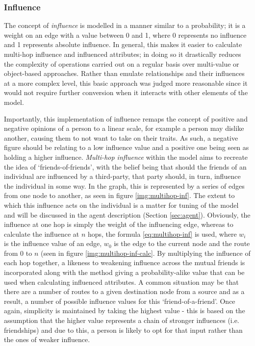 \documentclass[]{report}
\begin{document}
\subsubsection{Influence}
The concept of \emph{influence} is modelled in a manner similar to a probability; it is a weight on an edge with a value between 0 and 1, where 0 represents no influence and 1 represents absolute influence. In general, this makes it easier to calculate multi-hop influence and influenced attributes; in doing so it drastically reduces the complexity of operations carried out on a regular basis over multi-value or object-based approaches. Rather than emulate relationships and their influences at a more complex level, this basic approach was judged more reasonable since it would not require further conversion when it interacts with other elements of the model. 

Importantly, this implementation of influence remaps the concept of positive and negative opinions of a person to a linear scale, for example a person may dislike another, causing them to not want to take on their traits. As such, a negative figure should be relating to a low influence value and a positive one being seen as holding a higher influence.
\emph{Multi-hop influence} within the model aims to recreate the idea of `friends-of-friends', with the belief being that should the friends of an individual are influenced by a third-party, that party should, in turn, influence the individual in some way. In the graph, this is represented by a series of edges from one node to another, as seen in figure \ref{img:multihop-inf}. The extent to which this influence acts on the individual is a matter for tuning of the model and will be discussed in the agent description (Section \ref{sec:agent}). Obviously, the influence at one hop is simply the weight of the influencing edge, whereas to calculate the influence at $n$ hops, the formula \ref{eq:multihop-inf} is used, where $w_{i}$ is the influence value of an edge, $w_{0}$ is the edge to the current node and the route from $0$ to $n$ (seen in figure \ref{img:multihop-inf-calc}. By multiplying the influence of each hop together, a likeness to weakening influence across the mutual friends is incorporated along with the method giving a probability-alike value that can be used when calculating influenced attributes. A common situation may be that there are a number of routes to a given destination node from a source and as a result, a number of possible influence values for this `friend-of-a-friend'. Once again, simplicity is maintained by taking the highest value - this is based on the assumption that the higher value represents a chain of stronger influences (i.e. friendships) and due to this, a person is likely to opt for that input rather than the ones of weaker influence.
\end{document}
